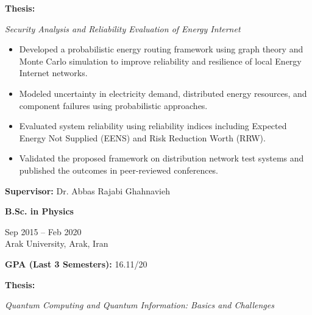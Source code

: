 \documentclass[letter,20pt]{article}
\begin{document}
\vspace{4pt}


\hspace{10pt}
\textbf{Thesis:}

\textit{
Security Analysis and Reliability Evaluation of Energy Internet
}


\begin{itemize}
[
noitemsep,
topsep=3pt,
leftmargin=8ex
]

\item
Developed a probabilistic energy routing framework using graph theory and Monte Carlo simulation to improve reliability and resilience of local Energy Internet networks.

\item
Modeled uncertainty in electricity demand, distributed energy resources, and component failures using probabilistic approaches.

\item
Evaluated system reliability using reliability indices including Expected Energy Not Supplied (EENS) and Risk Reduction Worth (RRW).

\item
Validated the proposed framework on distribution network test systems and published the outcomes in peer-reviewed conferences.

\end{itemize}


\hspace{10pt}
\textbf{Supervisor:}
Dr. Abbas Rajabi Ghahnavieh



\vspace{12pt}



\textbf{B.Sc. in Physics}

\hfill
{\footnotesize Sep 2015 -- Feb 2020}
\\[4pt]


\hspace{10pt}
Arak University, Arak, Iran

\hfill

\textbf{GPA (Last 3 Semesters):}
16.11/20


\vspace{4pt}


\hspace{10pt}
\textbf{Thesis:}

\textit{
Quantum Computing and Quantum Information: Basics and Challenges
}
\end{document}
